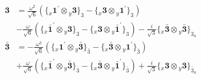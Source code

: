 \documentclass[english]{article}
\newcommand{\rep}[1]{\mathbf{#1}}
\newcommand{\repx}[2]{{}_{#2}\mathbf{#1}}
\newcommand{\subcg}[3]{\big\{ \repx{#1}{x}\otimes\repx{#2}{y}\big\}^{}_{#3}}
\begin{document}
\begin{itemize}
\begin{align*}
\\
\rep{3} & = \frac{\omega ^2}{\sqrt{6}}\left(\subcg{1^{\prime}}{3}{3}-\subcg{3}{1^{\prime}}{3}\right) \\ 
 & -\frac{\omega }{\sqrt{6}}\left(\subcg{\bar{1}^{\prime}}{3}{3}-\subcg{3}{\bar{1}^{\prime}}{3}\right)-\frac{i}{\sqrt{3}}\subcg{\bar{3}}{\bar{3}}{3_{a}}
\\
\rep{\bar{3}} & = -\frac{\omega ^2}{\sqrt{6}}\left(\subcg{1^{\prime}}{\bar{3}}{\bar{3}}-\subcg{\bar{3}}{1^{\prime}}{\bar{3}}\right) \\ 
 & +\frac{\omega }{\sqrt{6}}\left(\subcg{\bar{1}^{\prime}}{\bar{3}}{\bar{3}}-\subcg{\bar{3}}{\bar{1}^{\prime}}{\bar{3}}\right)+\frac{i}{\sqrt{3}}\subcg{3}{3}{\bar{3}_{a}}
\end{align*}
\end{itemize}
\end{document}
